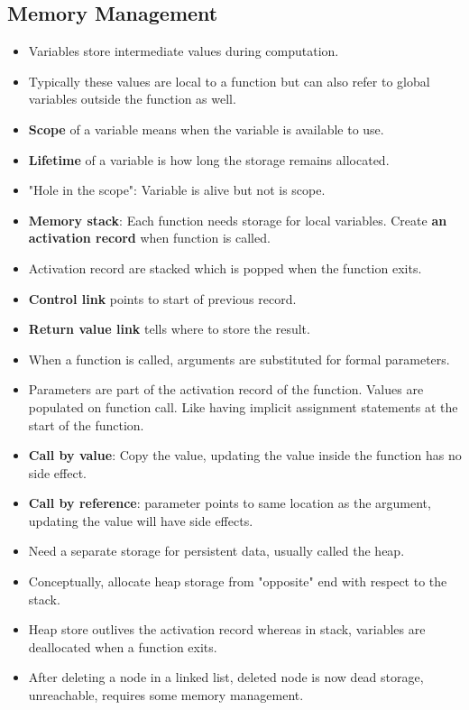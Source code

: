 \documentclass[a4paper]{article}
\begin{document}
\subsection{Memory Management}
\begin{itemize}
    \item Variables store intermediate values during computation.
    \item Typically these values are local to a function but can also refer to global variables outside the function as well.
    \item \textbf{Scope} of a variable means when the variable is available to use.
    \item \textbf{Lifetime} of a variable is how long the storage remains allocated.
    \item "Hole in the scope": Variable is alive but not is scope.
    \item \textbf{Memory stack}: Each function needs storage for local variables. Create \textbf{an activation record} when function is called.
    \item Activation record are stacked which is popped when the function exits.
    \item \textbf{Control link} points to start of previous record.
    \item \textbf{Return value link} tells where to store the result.
    \item When a function is called, arguments are substituted for formal parameters.
    \item Parameters are part of the activation record of the function. Values are populated on function call. Like having implicit assignment statements at the start of the function.
    \item \textbf{Call by value}: Copy the value, updating the value inside the function has no side effect.
    \item \textbf{Call by reference}: parameter points to same location as the argument, updating the value will have side effects.
    \item Need a separate storage for persistent data, usually called the heap.
    \item Conceptually, allocate heap storage from "opposite" end with respect to the stack.
    \item Heap store outlives the activation record whereas in stack, variables are deallocated when a function exits.
    \item After deleting a node in a linked list, deleted node is now dead storage, unreachable, requires some memory management.

\end{itemize}
\end{document}
